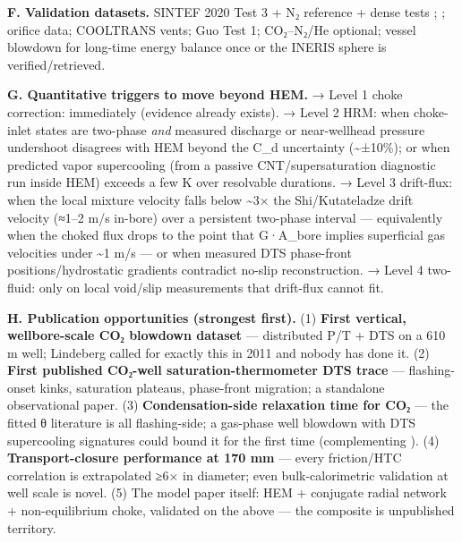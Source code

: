 \textbf{F. Validation datasets.} SINTEF 2020 Test 3 + N₂ reference + dense tests \citep{munkejord2020,sintef2020data}; \citet{botros2016}; \citet{hammer2022} orifice data; COOLTRANS vents; Guo Test 1; CO₂--N₂/He \citep{munkejord2021,sintef2021data} optional; vessel blowdown for long-time energy balance once \citet{gebbeken1996} or the INERIS sphere is verified/retrieved.

\textbf{G. Quantitative triggers to move beyond HEM.} → Level 1 choke
correction: immediately (evidence already exists). → Level 2 HRM: when
choke-inlet states are two-phase \emph{and} measured discharge or
near-wellhead pressure undershoot disagrees with HEM beyond the C\_d
uncertainty (\textasciitilde±10\%); or when predicted vapor supercooling
(from a passive CNT/supersaturation diagnostic run inside HEM) exceeds a
few K over resolvable durations. → Level 3 drift-flux: when the local
mixture velocity falls below \textasciitilde3× the Shi/Kutateladze drift
velocity (≈1--2 m/s in-bore) over a persistent two-phase interval ---
equivalently when the choked flux drops to the point that G·A\_bore
implies superficial gas velocities under \textasciitilde1 m/s --- or
when measured DTS phase-front positions/hydrostatic gradients contradict
no-slip reconstruction. → Level 4 two-fluid: only on local void/slip
measurements that drift-flux cannot fit.

\textbf{H. Publication opportunities (strongest first).} (1)
\textbf{First vertical, wellbore-scale CO₂ blowdown dataset} ---
distributed P/T + DTS on a 610 m well; Lindeberg called for exactly this
in 2011 and nobody has done it. (2) \textbf{First published CO₂-well
saturation-thermometer DTS trace} --- flashing-onset kinks, saturation
plateaus, phase-front migration; a standalone observational paper. (3)
\textbf{Condensation-side relaxation time for CO₂} --- the fitted θ
literature is all flashing-side; a gas-phase well blowdown with DTS
supercooling signatures could bound it for the first time (complementing \citealp{hammer2025}). (4) \textbf{Transport-closure performance at 170
mm} --- every friction/HTC correlation is extrapolated ≥6× in diameter;
even bulk-calorimetric validation at well scale is novel. (5) The model
paper itself: HEM + conjugate radial network + non-equilibrium choke,
validated on the above --- the composite is unpublished territory.

